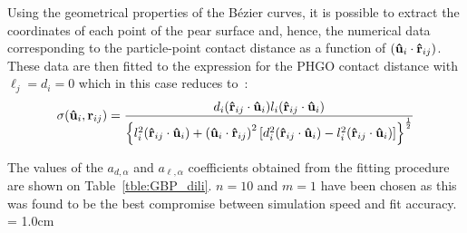 
Using the geometrical properties of the B\'ezier curves, it is possible 
to extract the coordinates of each point of the pear surface and, hence, the numerical data
corresponding to the particle-point contact distance as a function of $\left( \mathbf{\hat{u} }_i \cdot \mathbf{\hat{r} }_{ij} \right)$. 
These data are then fitted to the expression for the PHGO contact distance with
$\ell_j=d_i=0$ which in this case reduces to~:
\begin{equation}
	\sigma(\mathbf{\hat{u} }_i,\mathbf{r}_{ij}) = \frac{d_i(\mathbf{\hat{r} }_{ij} \cdot \mathbf{\hat{u} }_i)l_i(\mathbf{\hat{r} }_{ij} \cdot \mathbf{\hat{u} }_i)}
	{\left\{ l_i^2(\mathbf{\hat{r} }_{ij} \cdot \mathbf{\hat{u} }_i) +
	\left( \mathbf{\hat{u} }_i \cdot \mathbf{\hat{r} }_{ij} \right)^2\left[ d_i^2(\mathbf{\hat{r} }_{ij} \cdot \mathbf{\hat{u} }_i)- l_i^2(\mathbf{\hat{r} }_{ij} \cdot \mathbf{\hat{u} }_i)
	\right] \right\}^{\frac{1}{2}}}
	\label{eqn:GBP_sir}
\end{equation}

The values of the $a_{d,\alpha}$ and $a_{\ell,\alpha}$ coefficients obtained from the fitting
procedure are shown on Table~\ref{tble:GBP_dili}. $n=10$ and
$m=1$ have been chosen as this was found to be the best compromise between simulation speed 
and fit accuracy.
%
\tabul = 1.0cm
